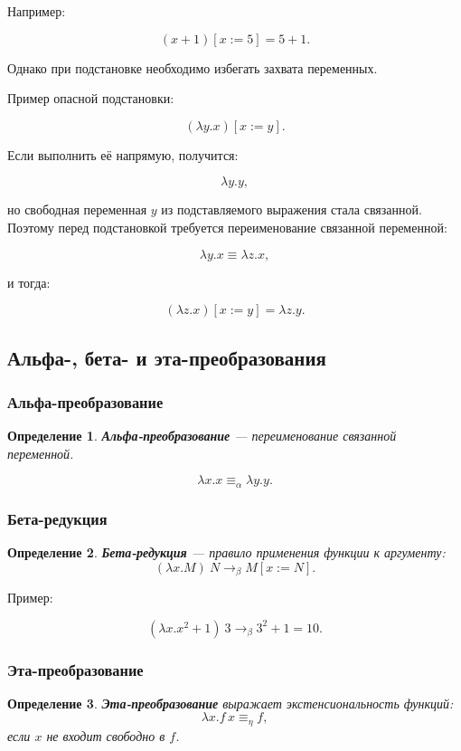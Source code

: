 \documentclass[12pt,a4paper]{article}
\newtheorem{definition}{Определение}
\begin{document}
Например:

\[
(x + 1)[x := 5] = 5 + 1.
\]

Однако при подстановке необходимо избегать захвата переменных.

Пример опасной подстановки:

\[
(\lambda y. x)[x := y].
\]

Если выполнить её напрямую, получится:

\[
\lambda y. y,
\]

но свободная переменная $y$ из подставляемого выражения стала связанной. Поэтому перед подстановкой требуется переименование связанной переменной:

\[
\lambda y. x \equiv \lambda z. x,
\]

и тогда:

\[
(\lambda z. x)[x := y] = \lambda z. y.
\]

\subsection{Альфа-, бета- и эта-преобразования}

\subsubsection{Альфа-преобразование}

\begin{definition}
\textbf{Альфа-преобразование} --- переименование связанной переменной.
\end{definition}

\[
\lambda x. x \equiv_\alpha \lambda y. y.
\]

\subsubsection{Бета-редукция}

\begin{definition}
\textbf{Бета-редукция} --- правило применения функции к аргументу:
\[
(\lambda x.M)\ N \to_\beta M[x := N].
\]
\end{definition}

Пример:

\[
(\lambda x. x^2 + 1)\ 3
\to_\beta 3^2 + 1
= 10.
\]

\subsubsection{Эта-преобразование}

\begin{definition}
\textbf{Эта-преобразование} выражает экстенсиональность функций:
\[
\lambda x. f\,x \equiv_\eta f,
\]
если $x$ не входит свободно в $f$.
\end{definition}
\end{document}
